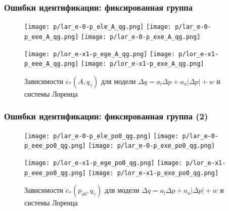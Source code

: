 \documentclass[10pt,utf8]{beamer}
\begin{document}
\begin{frame}
  \frametitle{Ошибки идентификации: фиксированная группа}

  \begin{figure}[htb!]
    \begin{center}
      \texttt{[image: p/lar\_e-0-p\_ele\_A\_qg.png]}
      \hfill
      \texttt{[image: p/lar\_e-0-p\_eee\_A\_qg.png]}
      \hfill
      \texttt{[image: p/lar\_e-0-p\_exe\_A\_qg.png]}
    \end{center}
    \begin{center}
      \texttt{[image: p/lor\_e-x1-p\_ege\_A\_qg.png]}
      \hfill
      \texttt{[image: p/lor\_e-x1-p\_eee\_A\_qg.png]}
      \hfill
      \texttt{[image: p/lor\_e-x1-p\_exe\_A\_qg.png]}
    \end{center}
    \caption{Зависимости $\overline{e}_{*}(A,q_\gamma) $ для модели $ \Delta q = a_l \Delta p + a_a |\Delta p| + w $ и системы Лоренца}
    \label{atu:f:iderr_Aqg}
  \end{figure}

\end{frame}




\begin{frame}
  \frametitle{Ошибки идентификации: фиксированная группа (2)}

  \begin{figure}[htb!]
    \begin{center}
      \texttt{[image: p/lar\_e-0-p\_ele\_po0\_qg.png]}
      \hfill
      \texttt{[image: p/lar\_e-0-p\_eee\_po0\_qg.png]}
      \hfill
      \texttt{[image: p/lar\_e-0-p\_exe\_po0\_qg.png]}
    \end{center}
    \begin{center}
      \texttt{[image: p/lor\_e-x1-p\_ege\_po0\_qg.png]}
      \hfill
      \texttt{[image: p/lor\_e-x1-p\_eee\_po0\_qg.png]}
      \hfill
      \texttt{[image: p/lor\_e-x1-p\_exe\_po0\_qg.png]}
    \end{center}
    \caption{Зависимости $\overline{e}_{*}(p_{o0},q_\gamma) $ для модели $ \Delta q = a_l \Delta p + a_a |\Delta p| + w $ и системы Лоренца}
    \label{atu:f:iderr_po0qg}
  \end{figure}

\end{frame}
\end{document}
